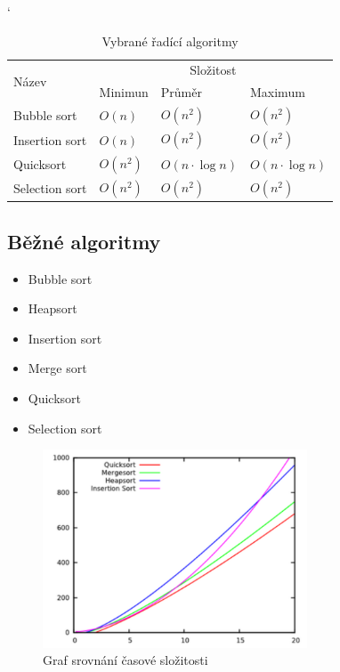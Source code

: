 \documentclass[a4paper,11pt]{article}
\begin{document}
	\begin{table}[H]\catcode`
		\centering
		\caption{Vybrané řadící algoritmy\cite{wiki}}
		\label{tab:tab1}
		\begin{tabular}{| l | l | l | l |} \hline
			\multirow{2}{*}{Název} & \multicolumn{3}{|c|}{Složitost} \\ \cline{2-4}
			 & Minimun & Průměr & Maximum \\ \hline
			Bubble sort & $O(n)$ & $O(n^2)$ & $O(n^2)$ \\ \hline
			Insertion sort & $O(n)$ & $O(n^2)$ & $O(n^2)$ \\ \hline
			Quicksort & $O(n^2)$ & $O(n \cdot \log n)$ & $O(n \cdot \log n)$ \\ \hline
			Selection sort & $O(n^2)$ & $O(n^2)$ & $O(n^2)$ \\ \hline
		\end{tabular}

	\end{table}
	
	\subsection{Běžné algoritmy}
	
	\begin{itemize}
		\item Bubble sort
		\item Heapsort
		\item Insertion sort
		\item Merge sort
		\item Quicksort
		\item Selection sort
	\end{itemize}
	
	\begin{figure}[H]
		\centering
    		\includegraphics[width=0.7\textwidth,natwidth=400,natheight=300]{ilustrace2.pdf}
		\caption{Graf srovnání časové složitosti \cite{img1}}
		\label{fig:img1}
	\end{figure}
	
\end{document}
